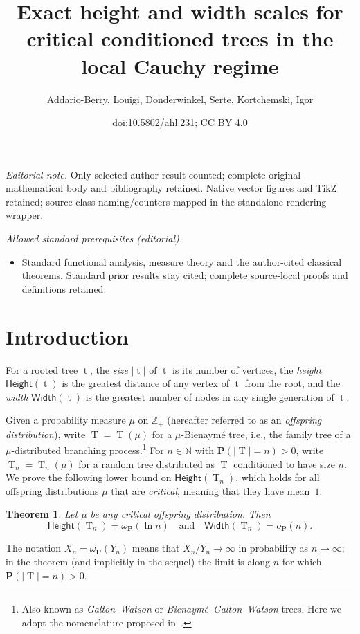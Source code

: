 \documentclass[10pt]{amsart}
\title{Exact height and width scales for critical conditioned trees in the local Cauchy regime}
\author{Addario-Berry, Louigi, Donderwinkel, Serte, Kortchemski, Igor}
\date{doi:10.5802/ahl.231; CC BY 4.0}
\newtheorem{theo}{Theorem}[section]
\theoremstyle{definition}\newtheorem{defi}[theo]{Definition}\newtheorem{rema}[theo]{Remark}\newtheorem{exam}[theo]{Example}\newtheorem{exem}[theo]{Example}\newtheorem{nota}[theo]{Notation}
\newcommand{\Z}{\mathbb{Z}}
\newcommand{\N}{\mathbb{N}}
\renewcommand{\H}{\mathsf{Height}}
\newcommand{\p}{\mathbf{P}}
\newcommand{\Width}{\mathsf{Width}}
\DeclareMathOperator{\tree}{t}
\DeclareMathOperator{\rtree}{T}
\begin{document}
\maketitle
\noindent\textit{Editorial note.} Only selected author result counted; complete original mathematical body and bibliography retained. Native vector figures and TikZ retained; source-class naming/counters mapped in the standalone rendering wrapper.\par\medskip
\noindent\textit{Allowed standard prerequisites (editorial).}\begin{itemize}
\item Standard functional analysis, measure theory and the author-cited classical theorems. Standard prior results stay cited; complete source-local proofs and definitions retained.
\end{itemize}\medskip



\section{Introduction}

For a rooted tree $\tree$, the \emph{size} $|\tree|$ of $\tree$ is its number of vertices, the \emph{height} $\H(\tree)$ is the greatest distance of any vertex of $\tree$ from the root, and the \emph{width} $\Width(\tree)$ is the greatest number of nodes in any single generation of $\tree$.

Given a probability measure $\mu$ on $\Z_{+}$ (hereafter referred to as an \emph{offspring distribution}), write $\rtree=\rtree(\mu)$ for a $\mu$-Bienaymé tree, i.e., the family tree of a $\mu$-distributed branching process.\footnote{Also known as \emph{Galton--Watson} or \emph{Bienaymé--Galton--Watson} trees. Here we adopt the nomenclature proposed in~\cite{ABHK21}.} For $n \in \N$ with $\p(|\rtree|=n)>0$, write $\rtree_n=\rtree_n(\mu)$ for a random tree distributed as $\rtree$ conditioned to have size $n$. We prove the following lower bound on $\H(\rtree_n)$, which holds for all offspring distributions $\mu$ that are \emph{critical}, meaning that they have mean~$1$.
\begin{theo}\label{thm:height_critical0}
Let $\mu$ be any critical offspring distribution. Then
\[
\H(\rtree_{n}) = \omega_{\p}(\ln n)
\quad \text{and} \quad
\Width(\rtree_n)=o_{\p}(n).
\]
\end{theo}

The notation $X_n = \omega_{\p}(Y_n)$ means that $X_n/Y_n \to \infty$ in probability as $n \to \infty$; in the theorem (and implicitly in the sequel) the limit is along $n$ for which $\p(|\rtree|=n)>0$.
\end{document}
